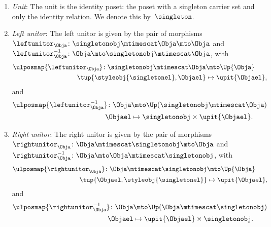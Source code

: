 \begin{lemma}
\begin{enumerate}
    \item \emph{Unit}: The unit is the identity poset: the poset with a singleton carrier set and only the identity relation.
    We denote this by~$\singleton$.
    \item \emph{Left unitor}: The left unitor is given by the pair of morphisms~$\leftunitor_\Obja\colon \singletonobj\mtimescat \Obja \mto \Obja$ and~$\leftunitor_\Obja^{-1}\colon \Obja \mto \singletonobj\mtimescat \Obja$, with
    \begin{equation}
        \begin{aligned}
            \ulposmap{\leftunitor_\Obja}\colon \singletonobj\mtimescat \Obja &\mto \Up{\Obja}\\
            \tup{\styleobj{\singletonel},\Objael}&\mapsto \upit\{\Objael\},
        \end{aligned}
    \end{equation}
    and
    \begin{equation}
        \begin{aligned}
            \ulposmap{\leftunitor_\Obja^{-1}}\colon \Obja &\mto \Up(\singletonobj\mtimescat \Obja) \\
            \Objael&\mapsto \singletonobj \times \upit \{\Objael\}.
        \end{aligned}
    \end{equation}
    \item \emph{Right unitor}: The right unitor is given by the pair of morphisms~$\rightunitor_\Obja\colon \Obja\mtimescat \singletonobj  \mto \Obja$ and~$\rightunitor_\Obja^{-1}\colon \Obja \mto \Obja \mtimescat \singletonobj$, with
    \begin{equation}
        \begin{aligned}
            \ulposmap{\rightunitor_\Obja}\colon \Obja\mtimescat \singletonobj  &\mto \Up{\Obja}\\
            \tup{\Objael,\styleobj{\singletonel}}&\mapsto \upit\{\Objael\},
        \end{aligned}
    \end{equation}
    and
    \begin{equation}
        \begin{aligned}
            \ulposmap{\rightunitor_\Obja^{-1}}\colon \Obja &\mto \Up( \Obja \mtimescat \singletonobj) \\
            \Objael&\mapsto \upit \{\Objael\} \times \singletonobj.
        \end{aligned}
    \end{equation}

\end{enumerate}
\end{lemma}
